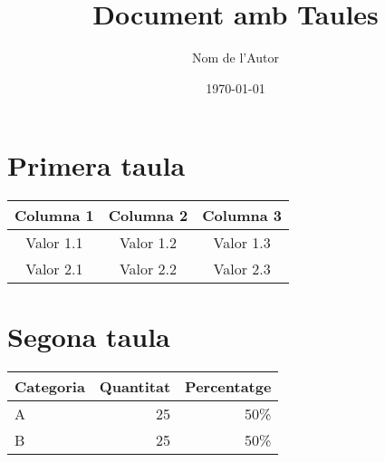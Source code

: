 \documentclass[a4paper,12pt]{article}
\begin{document}
\title{Document amb Taules}
\author{Nom de l'Autor}
\date{\today}

\maketitle

\section{Primera taula}

\begin{table}[h!]
    \centering
    \begin{tabular}{|c|c|c|}
        \hline
        Columna 1 & Columna 2 & Columna 3 \\
        \hline
        Valor 1.1 & Valor 1.2 & Valor 1.3 \\
        Valor 2.1 & Valor 2.2 & Valor 2.3 \\
        \hline
    \end{tabular}
\end{table}

\section{Segona taula}
\begin{table}[h!]
    \centering
    \begin{tabular}{|l|r|r|}
        \hline
        Categoria & Quantitat & Percentatge \\
        \hline
        A & 25 & 50\% \\
        B & 25 & 50\% \\
        \hline
    \end{tabular}
\end{table}
\end{document}
